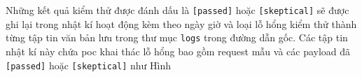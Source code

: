 Những kết quả kiểm thử được đánh dấu là \texttt{[passed]} hoặc \texttt{[skeptical]} sẽ được ghi lại trong nhật kí hoạt động kèm theo ngày giờ và loại lỗ hổng kiểm thử thành từng tập tin văn bản lưu trong thư mục \texttt{logs} trong đường dẫn gốc. Các tập tin nhật kí này chứa \acrshort{poc} khai thác lỗ hổng bao gồm request mẫu và các payload đã \texttt{[passed]} hoặc \texttt{[skeptical]} như Hình 
